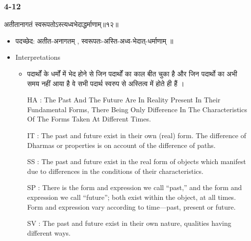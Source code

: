 \begin{frame}[fragile]\frametitle{4-12}
\begin{sanskrit}
अतीतानागतं स्वरूपतोऽस्त्यध्वभेदाद्धर्माणाम्॥१२॥
\end{sanskrit}

	\begin{itemize}
	\item पदच्छेद:  अतीत-अनागतम् , स्वरूपतः-अस्ति-अध्व-भेदात्-धर्माणाम् ॥
	\item Interpretations
		\begin{itemize}	
		\item पदार्थों के धर्मों में भेद होने से जिन पदार्थों का काल बीत चुका है और जिन पदार्थो का अभी समय नहीं आया है वे सभी पदार्थ स्वरुप से अस्तित्व में होते ही हैं ।
		\item [HA]: The Past And The Future Are In Reality Present In Their Fundamental Forms, There Being Only Difference In The Characteristics Of The Forms Taken At Different Times.
		\item [IT]: The past and future exist in their own (real) form. The difference of Dharmas or properties is on account of the difference of paths.
		\item [SS]: The past and future exist in the real form of objects which manifest due to differences in the conditions of their characteristics.
		\item [SP]: There is the form and expression we call “past,” and the form and expression we call “future”; both exist within the object, at all times. Form and expression vary according to time—past, present or future.
		\item [SV]: The past and future exist in their own nature, qualities having different ways. 
		\end{itemize}
	\end{itemize}
\end{frame}


